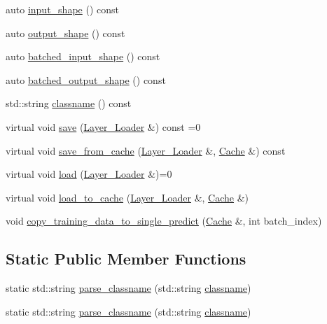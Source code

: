 \begin{DoxyCompactItemize}
\item 
auto \hyperlink{structbc_1_1nn_1_1Polymorphic__Layer__Base_ad62346d67a5ad6fbf84999e9254455b8}{input\+\_\+shape} () const
\item 
auto \hyperlink{structbc_1_1nn_1_1Polymorphic__Layer__Base_aa1e0b2c8f3de5576b73a27db6316b139}{output\+\_\+shape} () const
\item 
auto \hyperlink{structbc_1_1nn_1_1Polymorphic__Layer__Base_a362477a099ec16eeafcda0527ca711b2}{batched\+\_\+input\+\_\+shape} () const
\item 
auto \hyperlink{structbc_1_1nn_1_1Polymorphic__Layer__Base_a93154c06cdfce8282d48a114055d3e2a}{batched\+\_\+output\+\_\+shape} () const
\item 
std\+::string \hyperlink{structbc_1_1nn_1_1Polymorphic__Layer__Base_a3a63312d3100e6a6c31ba6bd16578aa7}{classname} () const
\item 
virtual void \hyperlink{structbc_1_1nn_1_1Polymorphic__Layer__Base_aa3a70d0ea45bdd0d9f9932d7fafe3d3e}{save} (\hyperlink{structbc_1_1nn_1_1Layer__Loader}{Layer\+\_\+\+Loader} \&) const =0
\item 
virtual void \hyperlink{structbc_1_1nn_1_1Polymorphic__Layer__Base_a7ec52a754f51ae14d655de2e7ae2e1a6}{save\+\_\+from\+\_\+cache} (\hyperlink{structbc_1_1nn_1_1Layer__Loader}{Layer\+\_\+\+Loader} \&, \hyperlink{structbc_1_1nn_1_1Cache}{Cache} \&) const
\item 
virtual void \hyperlink{structbc_1_1nn_1_1Polymorphic__Layer__Base_ab22a722386024a1329715e738d57814c}{load} (\hyperlink{structbc_1_1nn_1_1Layer__Loader}{Layer\+\_\+\+Loader} \&)=0
\item 
virtual void \hyperlink{structbc_1_1nn_1_1Polymorphic__Layer__Base_a2e1cbfa3ead765b5eddcdbb617b08ecd}{load\+\_\+to\+\_\+cache} (\hyperlink{structbc_1_1nn_1_1Layer__Loader}{Layer\+\_\+\+Loader} \&, \hyperlink{structbc_1_1nn_1_1Cache}{Cache} \&)
\item 
void \hyperlink{structbc_1_1nn_1_1Polymorphic__Layer__Base_a1233eecaa679d32a0203c13870cbe564}{copy\+\_\+training\+\_\+data\+\_\+to\+\_\+single\+\_\+predict} (\hyperlink{structbc_1_1nn_1_1Cache}{Cache} \&, int batch\+\_\+index)
\end{DoxyCompactItemize}
\subsection*{Static Public Member Functions}
\begin{DoxyCompactItemize}
\item 
static std\+::string \hyperlink{structbc_1_1nn_1_1Polymorphic__Layer__Base_ac44549f47e2cac1e9b8e16a2ed2a7d41}{parse\+\_\+classname} (std\+::string \hyperlink{structbc_1_1nn_1_1Polymorphic__Layer__Base_a3a63312d3100e6a6c31ba6bd16578aa7}{classname})
\item 
static std\+::string \hyperlink{structbc_1_1nn_1_1Polymorphic__Layer__Base_ac44549f47e2cac1e9b8e16a2ed2a7d41}{parse\+\_\+classname} (std\+::string \hyperlink{structbc_1_1nn_1_1Polymorphic__Layer__Base_a3a63312d3100e6a6c31ba6bd16578aa7}{classname})
\end{DoxyCompactItemize}
